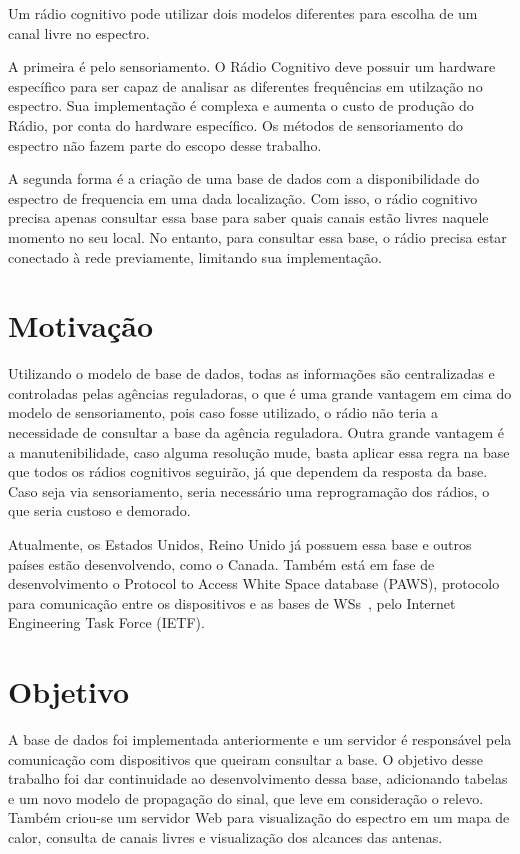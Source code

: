 Um rádio cognitivo pode utilizar dois modelos diferentes para escolha de um canal livre no espectro.

A primeira é pelo sensoriamento. O Rádio Cognitivo deve possuir um hardware específico para ser capaz de analisar as diferentes frequências em utilzação no espectro. Sua implementação é complexa e aumenta o custo de produção do Rádio, por conta do hardware específico. Os métodos de sensoriamento do espectro não fazem parte do escopo desse trabalho.

A segunda forma é a criação de uma base de dados com a disponibilidade do espectro de frequencia em uma dada localização. Com isso, o rádio cognitivo precisa apenas consultar essa base para saber quais canais estão livres naquele momento no seu local. No entanto, para consultar essa base, o rádio precisa estar conectado à rede previamente, limitando sua implementação.

\section{Motivação}

Utilizando o modelo de base de dados, todas as informações são centralizadas e controladas pelas agências reguladoras, o que é uma grande vantagem em cima do modelo de sensoriamento, pois caso fosse utilizado, o rádio não teria a necessidade de consultar a base da agência reguladora. Outra grande vantagem é a manutenibilidade, caso alguma resolução mude, basta aplicar essa regra na base que todos os rádios cognitivos seguirão, já que dependem da resposta da base. Caso seja via sensoriamento, seria necessário uma reprogramação dos rádios, o que seria custoso e demorado.

Atualmente, os Estados Unidos, Reino Unido já possuem essa base e outros países estão desenvolvendo, como o Canada.
Também está em fase de desenvolvimento o Protocol to Access White Space database (PAWS), protocolo para comunicação entre os dispositivos e as bases de WSs~\cite{RFC6953}, pelo Internet Engineering Task Force (IETF).


\section{Objetivo}

A base de dados foi implementada anteriormente e um servidor é responsável pela comunicação com dispositivos que queiram consultar a base. O objetivo desse trabalho foi dar continuidade ao desenvolvimento dessa base, adicionando tabelas e um novo modelo de propagação do sinal, que leve em consideração o relevo. Também criou-se um servidor Web para visualização do espectro em um mapa de calor, consulta de canais livres e visualização dos alcances das antenas.

